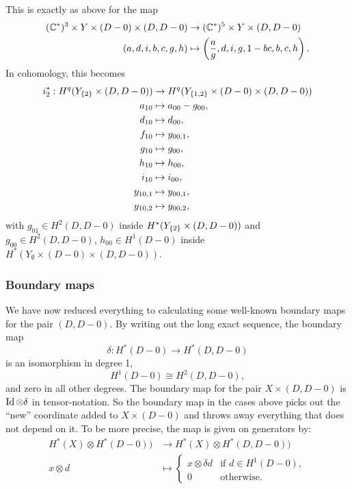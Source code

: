 This is exactly as above for the map
\begin{align*}
  (\mathbb{C}^*)^3 \times Y \times (D-0)\times (D,D-0) &\to (\mathbb{C}^*)^5 \times
  Y\times (D,D-0) \\ 
  (a,d,i,b,c,g,h) &\mapsto
  \left(\frac{a}{g},d,i,g,1-bc,b,c,h\right).
\end{align*}
In cohomology, this becomes
\begin{align*}
  i_2^* : H^q(Y_{\left\{ 2 \right\}}\times (D,D-0)) &\to H^q(Y_{\left\{ 1,2 \right\}}\times
  (D-0) \times (D,D-0)) \\
  a_{10} &\mapsto a_{00} - g_{00}, \\
  d_{10} &\mapsto d_{00}, \\
  f_{10} &\mapsto y_{00,1}, \\
  g_{10} &\mapsto g_{00}, \\
  h_{10} &\mapsto h_{00}, \\
  i_{10} & \mapsto i_{00}, \\
  y_{10,1} &\mapsto y_{00,1}, \\
  y_{10,2} &\mapsto y_{00,2},
\end{align*}
with $g_{01}\in H^2(D,D-0)$ inside $H^*(Y_{\left\{ 2 \right\}}\times (D,D-0))$ and
$g_{00}\in H^2(D,D-0)$, $h_{00}\in H^1(D-0)$ inside
$H^*(Y_{\emptyset}\times(D-0)\times(D,D-0))$.

\subsubsection{Boundary maps}
\label{disk}

We have now reduced everything to calculating some well-known boundary
maps for the pair $(D,D-0)$. By writing out the long exact sequence,
the boundary map
\[ \delta : H^*(D-0) \to H^*(D,D-0) \]
is an isomorphism in degree 1,
\[ H^1(D-0) \cong H^2(D,D-0), \]
and zero in all other degrees. The boundary map for the pair $X\times
(D,D-0)$ is $\operatorname{Id}\otimes \delta$ in tensor-notation. So the boundary
map in the cases above picks out the ``new'' coordinate added to
$X\times (D-0)$ and throws away everything that does not depend on
it. To be more precise, the map is given on generators by:
\begin{align*}
  H^*(X)\otimes H^*(D-0)) &\to H^*(X)\otimes H^*(D,D-0)) \\
  x\otimes d &\mapsto
  \begin{cases}
    x \otimes \delta d & \text{if } d\in H^1(D-0), \\
    0 & \text{otherwise}.
  \end{cases}
\end{align*}

